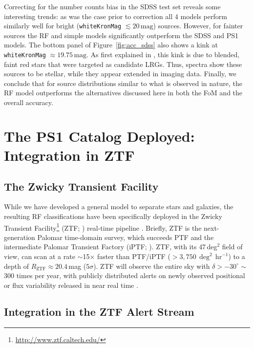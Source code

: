 \documentclass[twocolumn]{aastex62}
\begin{document}
\begin{CJK*}{UTF8}{gbsn}
Correcting for the number counts bias in the SDSS test set reveals some
interesting trends: as was the case prior to correction all 4 models perform
similarly well for bright (\texttt{whiteKronMag} $\lesssim
20\,\mathrm{mag}$) sources. However, for fainter sources the RF and simple
models significantly outperform the SDSS and PS1 models. The bottom panel of
Figure~\ref{fig:acc_sdss} also shows a kink at \texttt{whiteKronMag}
$\approx 19.75\,\mathrm{mag}$. As first explained in \citet{Miller17}, this
kink is due to blended, faint red stars that were targeted as candidate
LRGs. Thus, spectra show these sources to be stellar, while they appear
extended in imaging data. Finally, we conclude that for source distributions
similar to what is observed in nature, the RF model outperforms the
alternatives discussed here in both the FoM and the overall accuracy.


\section{The PS1 Catalog Deployed: Integration in ZTF}
\label{sec:ztf}

\subsection{The Zwicky Transient Facility}

While we have developed a general model to separate stars and galaxies, the
resulting RF classifications have been specifically deployed in the Zwicky
Transient Facility\footnote{\url{http://www.ztf.caltech.edu/}} (ZTF;
\citealt{Bellm:18:ZTF, Dekany:18:ZTF}) real-time pipeline
\citep{Masci:18:ZTF}. Briefly, ZTF is the next-generation Palomar
time-domain survey, which succeeds PTF \citep{Rau09, Law09} and the
intermediate Palomar Transient Factory (iPTF; \citealt{Kulkarni13}). ZTF,
with its 47\,deg$^2$ field of view, can scan at a rate $\sim$15$\times$
faster than PTF/iPTF ($>3{,}750\,\deg^2\,\mathrm{hr}^{-1}$) to a depth of
$R_\mathrm{ZTF} \approx 20.4$\,mag ($5\sigma$). ZTF will observe the entire
sky with $\delta > -30^{\circ}$ $\sim$300 times per year, with publicly
distributed alerts on newly observed positional or flux variability released
in near real time \citep{Patterson:18:ZTF}.

\subsection{Integration in the ZTF Alert Stream}


\end{CJK*}
\end{document}
